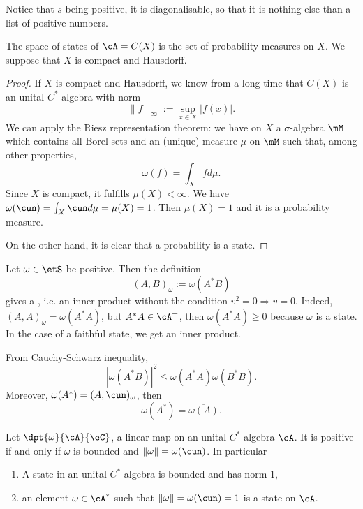 Notice that $s$ being positive, it is diagonalisable, so that it is nothing else than a list of positive numbers.


\begin{theorem}
The space of states of $\cA=C(X)$ is the set of probability measures on $X$. We suppose that $X$ is compact and Hausdorff.
\end{theorem}

\begin{proof}
If $X$ is compact and Hausdorff, we know from a long time that $C(X)$ is an unital $C^*$-algebra with norm
\[ 
  \| f \|_{\infty}:=\sup_{x\in X}| f(x) |.
\]
We can apply the Riesz representation theorem: we have on $X$ a $\sigma$-algebra $\mM$ which contains all Borel sets and an (unique) measure $\mu$ on $\mM$ such that, among other properties,
\begin{equation}
  \omega(f)=\int_Xfd\mu.
\end{equation}
Since $X$ is compact, it fulfills $\mu(X)<\infty$. We have $\omega(\cun)=\int_X\cun d\mu=\mu(X)=1$. Then $\mu(X)=1$ and it is a probability measure.

On the other hand, it is clear that a probability is a state.

\end{proof}

Let $\omega\in\etS$ be positive. Then the definition\label{PgStateInn}
\begin{equation} \label{eq:defprodetat}
(A,B)_{\omega}:=\omega(A^*B)
\end{equation}
gives a \label{pgdef_preinned}, i.e. an inner product without the condition $v^2=0\Rightarrow v=0$. Indeed, $(A,A)_{\omega}=\omega(A^*A)$, but $A^*A\in\cA^+$, then $\omega(A^*A)\geq 0$ because $\omega$ is a state. In the case of a faithful state, we get an inner product.

From Cauchy-Schwarz inequality,
\begin{equation} \label{eq:omABleq}
  | \omega(A^*B) |^2\leq \omega(A^*A)\omega(B^*B).
\end{equation}
Moreover, $\omega(A^*)=(A,\cun)_{\omega}$, then
\begin{equation} \label{eq:omABleqs}
  \omega(A^*)=\overline{\omega(A)}.
\end{equation}

\begin{proposition}
Let $\dpt{\omega}{\cA}{\eC}$, a linear map on an unital $C^*$-algebra $\cA$. It is positive if and only if $\omega$ is bounded and $\| \omega \|=\omega(\cun)$. In particular

\begin{enumerate}
\item A state in an unital $C^*$-algebra is bounded and has norm $1$, \label{71125ai}
\item an element $\omega\in\cA^*$ such that $\| \omega \|=\omega(\cun)=1$ is a state on $\cA$. \label{7125aii}
\end{enumerate}
\label{prop:linposboun}
\end{proposition}


